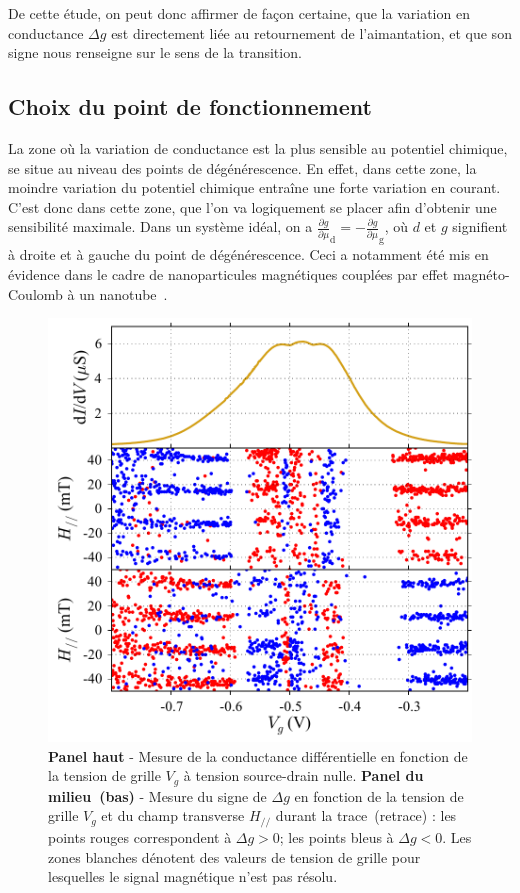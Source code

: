De cette étude, on peut donc affirmer de façon certaine, que la variation en conductance $\Delta g$ est directement liée au retournement de l'aimantation, et que son signe nous renseigne sur le sens de la transition.


\subsection{Choix du point de fonctionnement}
La zone où la variation de conductance est la plus sensible au potentiel chimique, se situe au niveau des points de dégénérescence. En effet, dans cette zone, la moindre variation du potentiel chimique entraîne une forte variation en courant. C'est donc dans cette zone, que l'on va logiquement se placer afin d'obtenir une sensibilité maximale. Dans un système idéal, on a $\frac{\partial g}{\partial \mu}_{\text{d}} = -\frac{\partial g}{\partial \mu}_{\text{g}}$, où $d$ et $g$ signifient à droite et à gauche du point de dégénérescence. Ceci a notamment été mis en évidence dans le cadre de nanoparticules magnétiques couplées par effet magnéto-Coulomb à un nanotube~\cite{Datta2011}.

\begin{figure}
\parbox{7cm}{
\includegraphics[scale=0.45]{Resultats/PointFonct/PointFonct.pdf} 
}
\parbox{6.5cm}{\caption{\textbf{Panel haut} - Mesure de la conductance différentielle en fonction de la tension de grille $V_g$ à tension source-drain nulle. \textbf{Panel du milieu~(bas)} - Mesure du signe de $\Delta g$ en fonction de la tension de grille $V_g$ et du champ transverse $H_{//}$ durant la trace~(retrace) : les points rouges correspondent à $\Delta g >0$; les points bleus à $\Delta g <0$. Les zones blanches dénotent des valeurs de tension de grille pour lesquelles le signal magnétique n'est pas résolu.}
\label{point_fonctio}
}
\end{figure}

